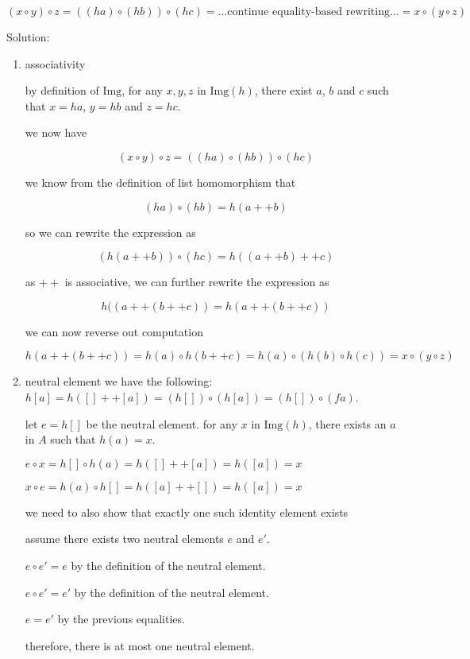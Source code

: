 \documentclass{article}
\begin{document}
$(x \circ y) \circ z = ( (h a) \circ (h b) ) \circ (h c) = \ldots\text{continue equality-based rewriting}\ldots = x \circ (y \circ z)$

Solution:

\begin{enumerate}
    \item associativity

    by definition of $\text{Img}$, for any $x, y, z$ in $\text{Img}(h)$, there exist $a$, $b$ and $c$ such that $x = h a$, $y = h b$ and $z = h c$. 

    we now have 

    \[
    (x \circ y) \circ z = ( (h a) \circ (h b) ) \circ (h c) 
    \]

    we know from the definition of list homomorphism that 

    \[
    (h a) \circ (h b) = h (a ++ b)
    \]

    so we can rewrite the expression as

    \[
    (h (a ++ b)) \circ (h c) = h ((a ++ b) ++ c)
    \]

    as $++$ is associative, we can further rewrite the expression as

    \[
    h ((a ++ (b ++ c)) = h (a ++ (b ++ c))
    \]

    we can now reverse out computation

    \[
    h(a ++ (b ++ c)) = h(a) \circ h(b ++ c) = h(a) \circ (h(b) \circ h(c)) = x \circ (y \circ z)
    \]

    \item neutral element
        we have the following:\\
        $h [a] = h ([] ++ [a]) = (h []) \circ (h [a]) = (h []) \circ (f a)$. 

        let $e = h []$ be the neutral element. 
        for any $x$ in $\text{Img}(h)$, there exists an $a$ in $A$ such that $h(a) = x$.

        $ e \circ x = h [] \circ h(a) = h( [] ++ [a]) = h([a]) = x$

        $ x \circ e = h(a) \circ h [] = h( [a] ++ []) = h([a]) = x$

        we need to also show that exactly one such identity element exists

        assume there exists two neutral elements $e$ and $e'$.

        $e \circ e' = e$ by the definition of the neutral element.

        $e \circ e' = e'$ by the definition of the neutral element.

        $e = e'$ by the previous equalities.

        therefore, there is at most one neutral element.
\end{enumerate}
\end{document}

